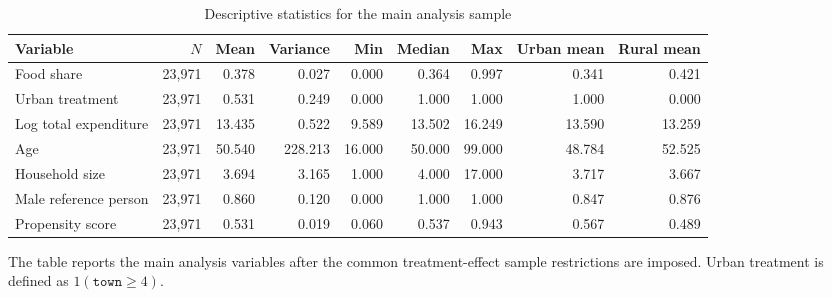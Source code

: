 \begin{table}[htbp]
\centering
\caption{Descriptive statistics for the main analysis sample}
\label{tab:sample_description}
\small
\begin{threeparttable}
\begin{adjustbox}{max width=\textwidth}
\begin{tabular}{lrrrrrrrr}
\toprule
Variable & $N$ & Mean & Variance & Min & Median & Max & Urban mean & Rural mean \\
\midrule
Food share & 23,971 & 0.378 & 0.027 & 0.000 & 0.364 & 0.997 & 0.341 & 0.421 \\
Urban treatment & 23,971 & 0.531 & 0.249 & 0.000 & 1.000 & 1.000 & 1.000 & 0.000 \\
Log total expenditure & 23,971 & 13.435 & 0.522 & 9.589 & 13.502 & 16.249 & 13.590 & 13.259 \\
Age & 23,971 & 50.540 & 228.213 & 16.000 & 50.000 & 99.000 & 48.784 & 52.525 \\
Household size & 23,971 & 3.694 & 3.165 & 1.000 & 4.000 & 17.000 & 3.717 & 3.667 \\
Male reference person & 23,971 & 0.860 & 0.120 & 0.000 & 1.000 & 1.000 & 0.847 & 0.876 \\
Propensity score & 23,971 & 0.531 & 0.019 & 0.060 & 0.537 & 0.943 & 0.567 & 0.489 \\
\bottomrule
\end{tabular}
\end{adjustbox}
\begin{tablenotes}[flushleft]
\footnotesize
\item The table reports the main analysis variables after the common treatment-effect sample restrictions are imposed. Urban treatment is defined as \(1(\texttt{town} \ge 4)\).
\end{tablenotes}
\end{threeparttable}
\end{table}
